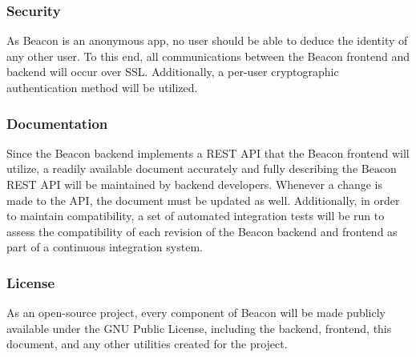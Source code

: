         \subsubsection{Security}
        As Beacon is an anonymous app, no user should be able to deduce the identity of
        any other user. To this end, all communications between the Beacon frontend and
        backend will occur over SSL. Additionally, a per-user cryptographic
        authentication method will be utilized.

        \subsubsection{Documentation}
        Since the Beacon backend implements a REST API that the Beacon frontend will
        utilize, a readily available document accurately and fully describing the
        Beacon REST API will be maintained by backend developers. Whenever a change 
        is made to the API, the document must be updated as well. Additionally, in
        order to maintain compatibility, a set of automated integration tests will be
        run to assess the compatibility of each revision of the Beacon backend and
        frontend as part of a continuous integration system.

        \subsubsection{License}
        As an open-source project, every component of Beacon will be made publicly
        available under the GNU Public License, including the backend, frontend, this
        document, and any other utilities created for the project.
